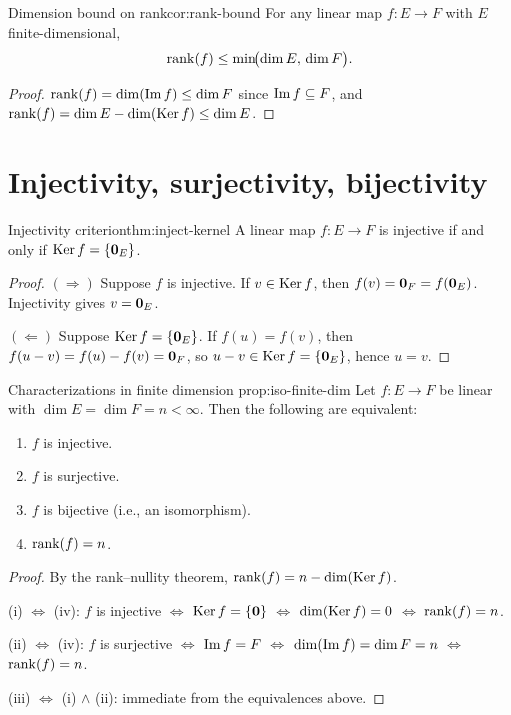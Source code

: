 \begin{corollary}{Dimension bound on rank}{cor:rank-bound}
For any linear map $f\colon E\to F$ with $E$ finite-dimensional,
\[
  \operatorname{rank}(f) \leq \min\!\bigl(\dim E,\, \dim F\bigr).
\]
\end{corollary}

\begin{proof}
$\operatorname{rank}(f) = \dim(\operatorname{Im} f) \leq \dim F$ since $\operatorname{Im} f\subseteq F$, and
$\operatorname{rank}(f) = \dim E - \dim(\operatorname{Ker} f) \leq \dim E$.
\end{proof}


\section{Injectivity, surjectivity, bijectivity}%
\label{sec:inject-surject-biject}

\begin{theorem}{Injectivity criterion}{thm:inject-kernel}
A linear map $f\colon E\to F$ is injective if and only if
$\operatorname{Ker} f = \left\{\mathbf{0}_E\right\}$.
\end{theorem}

\begin{proof}
$(\Rightarrow)$\; Suppose $f$ is injective. If $v\in\operatorname{Ker} f$, then
$f(v) = \mathbf{0}_F = f(\mathbf{0}_E)$. Injectivity gives $v = \mathbf{0}_E$.

$(\Leftarrow)$\; Suppose $\operatorname{Ker} f = \left\{\mathbf{0}_E\right\}$. If
$f(u) = f(v)$, then $f(u-v) = f(u)-f(v) = \mathbf{0}_F$, so
$u - v\in\operatorname{Ker} f = \left\{\mathbf{0}_E\right\}$, hence $u = v$.
\end{proof}

\begin{proposition}{Characterizations in finite dimension}%
{prop:iso-finite-dim}
Let $f\colon E\to F$ be linear with $\dim E = \dim F = n < \infty$.
Then the following are equivalent:
\begin{enumerate}[label=(\roman*)]
  \item $f$ is injective.
  \item $f$ is surjective.
  \item $f$ is bijective (i.e., an isomorphism).
  \item $\operatorname{rank}(f) = n$.
\end{enumerate}
\end{proposition}

\begin{proof}
By the rank--nullity theorem, $\operatorname{rank}(f) = n - \dim(\operatorname{Ker} f)$.

(i) $\Leftrightarrow$ (iv):
$f$ is injective $\Leftrightarrow$ $\operatorname{Ker} f = \left\{\mathbf{0}\right\}$
$\Leftrightarrow$ $\dim(\operatorname{Ker} f) = 0$ $\Leftrightarrow$ $\operatorname{rank}(f) = n$.

(ii) $\Leftrightarrow$ (iv):
$f$ is surjective $\Leftrightarrow$ $\operatorname{Im} f = F$
$\Leftrightarrow$ $\dim(\operatorname{Im} f) = \dim F = n$ $\Leftrightarrow$
$\operatorname{rank}(f) = n$.

(iii) $\Leftrightarrow$ (i) $\wedge$ (ii): immediate from the
equivalences above.
\end{proof}

